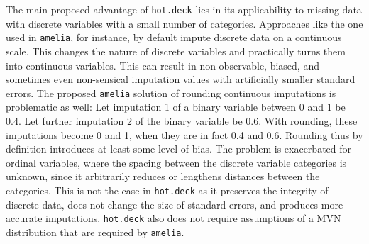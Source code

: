 \documentclass[12pt,econ]{sources/authesis}
\begin{document}
The main proposed advantage of \texttt{hot.deck} lies in its applicability to missing data with discrete variables with a small number of categories. Approaches like the one used in \texttt{amelia}, for instance, by default impute discrete data on a continuous scale. This changes the nature of discrete variables and practically turns them into continuous variables. This can result in non-observable, biased, and sometimes even non-sensical imputation values with artificially smaller standard errors. The proposed \texttt{amelia} solution of rounding continuous imputations is problematic as well: Let imputation 1 of a binary variable between 0 and 1 be 0.4. Let further imputation 2 of the binary variable be 0.6. With rounding, these imputations become 0 and 1, when they are in fact 0.4 and 0.6. Rounding thus by definition introduces at least some level of bias. The problem is exacerbated for ordinal variables, where the spacing between the discrete variable categories is unknown, since it arbitrarily reduces or lengthens distances between the categories. This is not the case in \texttt{hot.deck} as it preserves the integrity of discrete data, does not change the size of standard errors, and produces more accurate imputations. \texttt{hot.deck} also does not require assumptions of a MVN distribution that are required by \texttt{amelia}.
\end{document}
